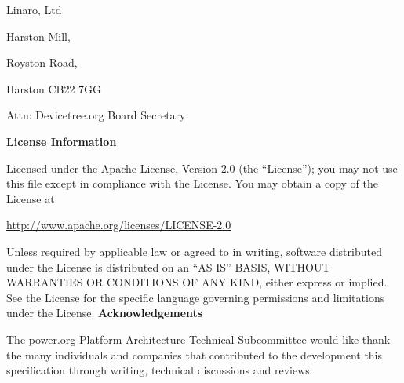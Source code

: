 \documentclass[a4paper,10pt,oneside]{sphinxmanual}
\begin{document}
\begin{DUlineblock}{0em}
\item[] Linaro, Ltd
\item[] Harston Mill,
\item[] Royston Road,
\item[] Harston CB22 7GG
\item[] Attn: Devicetree.org Board Secretary
\end{DUlineblock}

\textbf{License Information}

Licensed under the Apache License, Version 2.0 (the ``License'');
you may not use this file except in compliance with the License.
You may obtain a copy of the License at

\url{http://www.apache.org/licenses/LICENSE-2.0}

Unless required by applicable law or agreed to in writing, software
distributed under the License is distributed on an ``AS IS'' BASIS,
WITHOUT WARRANTIES OR CONDITIONS OF ANY KIND, either express or implied.
See the License for the specific language governing permissions and
limitations under the License.
\newpage
\textbf{Acknowledgements}

The power.org Platform Architecture Technical Subcommittee would like
thank the many individuals and companies that contributed to the
development this specification through writing, technical discussions
and reviews.
\end{document}
